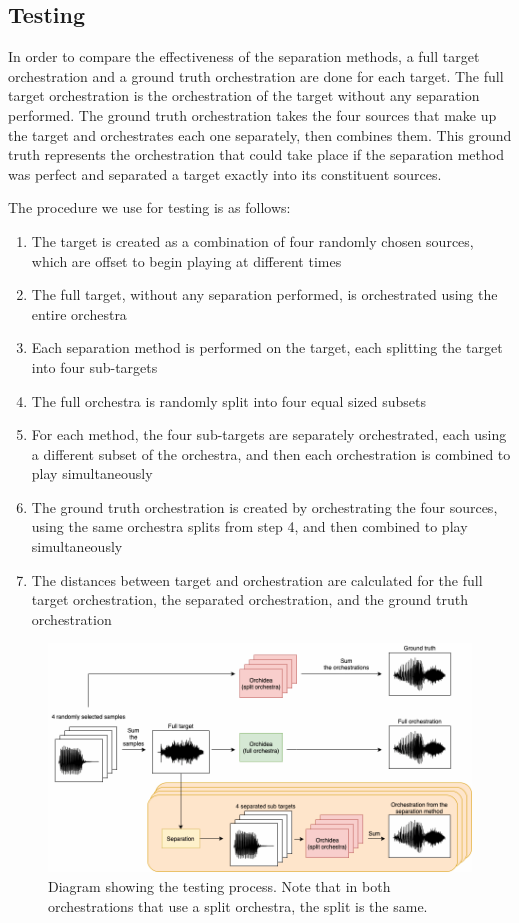 \documentclass{article}
\begin{document}
		\subsection{Testing}
		In order to compare the effectiveness of the separation methods, a full target orchestration and a ground truth orchestration are done for each target. The full target orchestration is the orchestration of the target without any separation performed. The ground truth orchestration takes the four sources that make up the target and orchestrates each one separately, then combines them. This ground truth represents the orchestration that could take place if the separation method was perfect and separated a target exactly into its constituent sources. 
		
		The procedure we use for testing is as follows:
		\begin{enumerate}
			\item The target is created as a combination of four randomly chosen sources, which are offset to begin playing at different times
			\item The full target, without any separation performed, is orchestrated using the entire orchestra
			\item Each separation method is performed on the target, each splitting the target into four sub-targets 
			\item The full orchestra is randomly split into four equal sized subsets
			\item For each method, the four sub-targets are separately orchestrated, each using a different subset of the orchestra, and then each orchestration is combined to play simultaneously
			\item The ground truth orchestration is created by orchestrating the four sources, using the same orchestra splits from step 4, and then combined to play simultaneously
			\item The distances between target and orchestration are calculated for the full target orchestration, the separated orchestration, and the ground truth orchestration 
		\end{enumerate}	

		\begin{figure}[t]
			\centering
				\includegraphics[width=\textwidth]{figures/evaluation_diagram.png}
				\caption{Diagram showing the testing process. Note that in both orchestrations that use a split orchestra, the split is the same.}\label{fig:eval_diagram}
		\end{figure}
		
\end{document}
